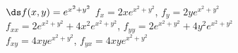 {$\ds f(x,y) = e^{x^2+y^2}$
}
{$f_x=2xe^{x^2+y^2}$, $f_y=2ye^{x^2+y^2}$\\
$f_{xx}=2e^{x^2+y^2}+4x^2e^{x^2+y^2}$, $f_{yy}=2e^{x^2+y^2}+4y^2e^{x^2+y^2}$\\
$f_{xy}=4xye^{x^2+y^2}$, $f_{yx}=4xye^{x^2+y^2}$\\
}